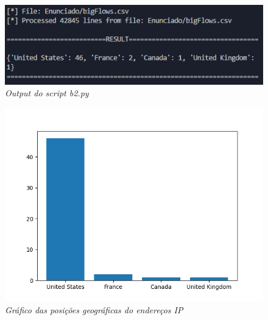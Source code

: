 \begin{figure}[h!]
    \label{high}
    \centering
    \includegraphics[width=1\textwidth]{Images/b2/b2_b.png}
    \caption{\textit{Output do script b2.py}}
\end{figure}

\begin{figure}[h!]
    \label{high}
    \centering
    \includegraphics[width=1\textwidth]{Images/b2/b2_2.png}
    \caption{\textit{Gráfico das posições geográficas do endereços IP}}
\end{figure}